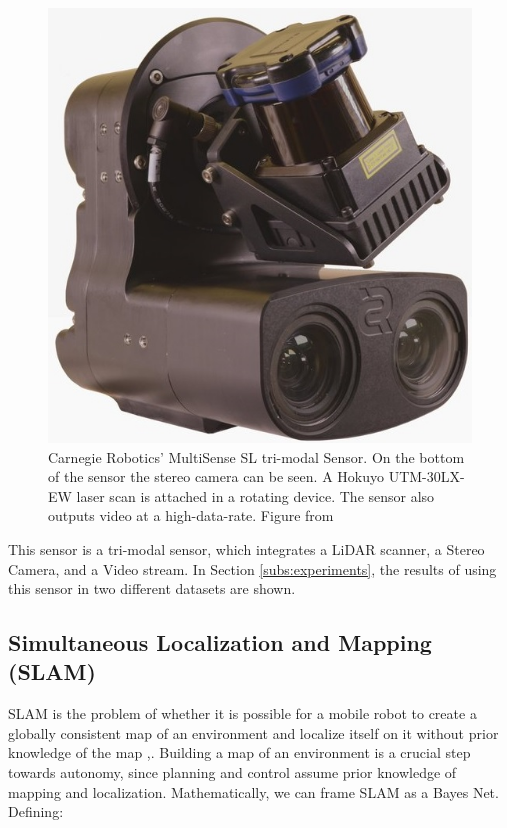 \documentclass[11pt]{article}
\begin{document}
\begin{figure}
	\begin{minipage}{0.45\textwidth}
		\centering
		\includegraphics[width=\textwidth]{MultiSenseSL}
	\end{minipage} \hfill
	\begin{minipage}{0.55\textwidth}
		\centering
		\caption{Carnegie Robotics' MultiSense SL tri-modal Sensor. On the bottom of the sensor the stereo camera can be seen. A Hokuyo UTM-30LX-EW laser scan is attached in a rotating device. The sensor also outputs video at a high-data-rate. Figure from \cite{MultiSenseSLSensor}}
		\label{fig:MultiSenseSLSensor}
	\end{minipage}				
\end{figure}

This sensor is a tri-modal sensor, which integrates a LiDAR scanner, a Stereo Camera, and a Video stream. In Section \ref{subs:experiments}, the results of using this sensor in two different datasets are shown.
	

	\subsection{Simultaneous Localization and Mapping (SLAM)}
	\label{subs:SLAMRev}

SLAM is the problem of whether it is possible for a mobile robot to create a globally consistent map of an environment and localize itself on it without prior knowledge of the map \cite{SLAMPartI0},\cite{Cadena}. Building a map of an environment is a crucial step towards autonomy, since planning and control assume prior knowledge of mapping and localization. Mathematically, we can frame SLAM as a Bayes Net. Defining:
	
\end{document}
